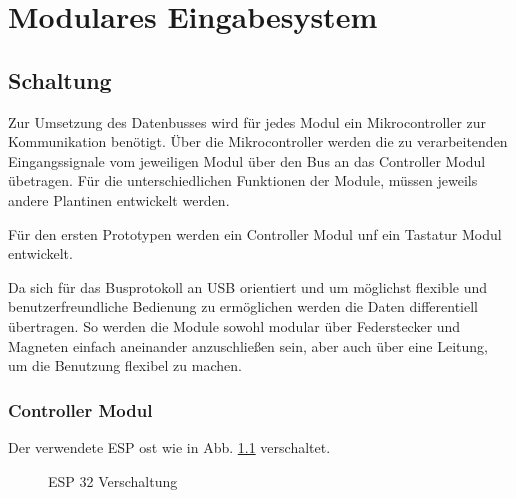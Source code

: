 \chapter{Modulares Eingabesystem}
\section{Schaltung}

Zur Umsetzung des Datenbusses wird für jedes Modul ein Mikrocontroller zur Kommunikation benötigt. 
Über die Mikrocontroller werden die zu verarbeitenden Eingangssignale vom jeweiligen Modul über den Bus an das Controller Modul übetragen. Für die 
unterschiedlichen Funktionen der Module, müssen jeweils andere Plantinen entwickelt werden. 

Für den ersten Prototypen werden ein Controller Modul unf ein Tastatur Modul entwickelt.


Da sich für das Busprotokoll an USB orientiert und um möglichst flexible und benutzerfreundliche Bedienung zu ermöglichen werden die Daten differentiell 
übertragen. So werden die Module sowohl modular über Federstecker und Magneten einfach aneinander anzuschließen sein, aber auch über eine Leitung, um die Benutzung flexibel zu machen.


\subsection{Controller Modul}
Der verwendete ESP ost wie in Abb. \ref{ESP} verschaltet.

\begin{figure}[H]
    \centering    
    \caption{ESP 32 Verschaltung}
    \label{ESP}
\end{figure}

